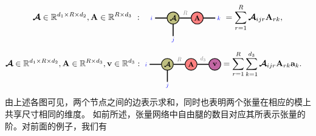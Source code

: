 \begin{align}\label{eq:tenmat}
\At\in\RR^{d_1\times R\times d_2},\Ab\in\RR^{R\times d_3}\ :\ \
\begin{tikzpicture}[baseline = \baseline]
    \tikzset{tensor/.style = {minimum size = 0.5cm,shape = circle,thick,draw=black,inner sep = 0pt}, edge/.style = {thick,line width=.4mm},every loop/.style={}}
    \def\y{0}
    \def\x{0}
    \node[tensor,fill=green!50!red!50!white] (At) at (\x,\y){\scalebox{0.85}{$\At$}};
    \node[tensor,fill=red!50!white] (A) at (\x+1,\y){\scalebox{0.85}{$\Ab$}};
    \draw[edge] (At) -- (A) node [above,midway] {\scalebox{0.7}{\dimcolor{$R$}}};
    \draw[edge] (\x-0.25,\y) -- (\x-0.75,\y)  node [pos=1.3] {\scalebox{0.7}{\indcolor{$i$}}};
    \draw[edge] (\x,\y-0.25) -- (\x,\y-0.75)  node [pos=1.3] {\scalebox{0.7}{\indcolor{$j$}}};
    \draw[edge] (\x+1.25,\y) -- (\x+1.75,\y)  node [pos=1.3] {\scalebox{0.7}{\indcolor{$k$}}};
\end{tikzpicture} 
= \sum_{r=1}^R\At_{ijr}\Ab_{rk},
\end{align}
\begin{align}\label{eq:tenmatvec}
\At\in\RR^{d_1\times R\times d_2},\Ab\in\RR^{R\times d_3}, \vb\in\RR^{d_3}&:
   \begin{tikzpicture}[baseline = \baseline]
    \tikzset{tensor/.style = {minimum size = 0.5cm,shape = circle,thick,draw=black,inner sep = 0pt}, edge/.style = {thick,line width=.4mm},every loop/.style={}}
    \def\y{0}
    \def\x{0}
    \node[tensor,fill=green!50!red!50!white] (At) at (\x,\y){\scalebox{0.85}{$\At$}};
    \node[tensor,fill=red!50!white] (A) at (\x+1,\y){\scalebox{0.85}{$\Ab$}};
    \node[tensor,fill=blue!40!red!60!white] (a) at (\x+2,\y){\scalebox{0.85}{$\vb$}};
    \draw[edge] (At) -- (A) node [above,midway] {\scalebox{0.7}{\dimcolor{$R$}}};
    \draw[edge] (A) -- (a) node [above,midway] {\scalebox{0.7}{\dimcolor{$d_3$}}};
    \draw[edge] (\x-0.25,\y) -- (\x-0.75,\y)  node [pos=1.3] {\scalebox{0.7}{\indcolor{$i$}}};
    \draw[edge] (\x,\y-0.25) -- (\x,\y-0.75)  node [pos=1.3] {\scalebox{0.7}{\indcolor{$j$}}};
    \end{tikzpicture} 
= \sum_{r=1}^R\sum_{k=1}^{d_3}\At_{ijr}\Ab_{rk}\ab_{k}.
\end{align}
由上述各图可见，两个节点之间的边表示求和，同时也表明两个张量在相应的模上共享尺寸相同的维度。
如前所述，张量网络中自由腿的数目对应其所表示张量的阶。对前面的例子，我们有

